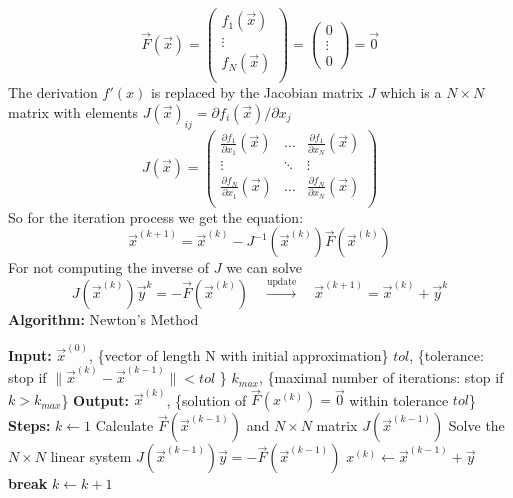 \documentclass[8pt,a4paper]{scrartcl}
\begin{document}
\begin{multicols*}{3}
\begin{equation*}
\vec F( \vec x) =
\begin{pmatrix}
f_1(\vec x) \\
\vdots \\
f_N(\vec x) \\
\end{pmatrix}
=
\begin{pmatrix}
0\\
\vdots \\
0
\end{pmatrix}
= \vec 0
\end{equation*}
The derivation $f'(x)$ is replaced by the Jacobian matrix $J$ which is a $N \times N$ matrix with elements $J(\vec x)_{ij} = \partial f_i(\vec x) / \partial x_j$
\begin{equation*}
J(\vec x) = 
\begin{pmatrix}
\frac{\partial f_1}{\partial x_1}(\vec x)  & \dots & \frac{\partial f_1}{\partial x_N}(\vec x)\\
\vdots & \ddots & \vdots\\
\frac{\partial f_N}{\partial x_1}(\vec x) & \dots & \frac{\partial f_N}{\partial x_N}(\vec x)\\
\end{pmatrix}
\end{equation*}
So for the iteration process we get the equation:
\begin{equation*}
\vec x^{(k+1)} = \vec x^{(k)} - J^{-1}(\vec x^{(k)})\vec F (\vec x^{(k)})
\end{equation*}
For not computing the inverse of $J$ we can solve
\begin{equation*}
J(\vec x^{(k)}) \vec y^k = - \vec F (\vec x^{(k)}) \quad \xrightarrow{\text{update}} \quad \vec x^{(k+1)} = \vec x^{(k)} + \vec y^k
\end{equation*}
\noindent
\textbf{Algorithm:} Newton's Method\\
\begin{algorithmic}
\State \textbf{Input:}
\State $\vec x^{(0)}$, \{vector of length N with initial approximation\}
\State $tol$, \{tolerance: stop if $\|\vec x^{(k)} - \vec x^{(k-1)}\| < tol$ \}
\State $k_{max}$, \{maximal number of iterations: stop if $k > k_{max}$\}
\State \textbf{Output:}
\State $\vec x^{(k)}$, \{solution of $\vec F(x^{(k)}) = \vec 0$ within tolerance $tol$\}
\State \textbf{Steps:}
\State $k \leftarrow 1$
\State Calculate $\vec F(\vec x^{(k-1)})$ and $N \times N$ matrix $J(\vec x^{(k-1)})$
\State Solve the $N \times N$ linear system $J(\vec x^{(k-1)}) \vec y =  - \vec F (\vec x^{(k-1)}) $
\State $x^{(k)} \leftarrow \vec x^{(k-1)} + \vec y$
\State \textbf{break}
\EndIf
\State $k \leftarrow k + 1$
\EndWhile
\end{algorithmic}


\end{multicols*}
\end{document}
